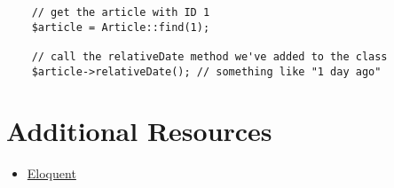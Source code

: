 \begin{verbatim}
    // get the article with ID 1
    $article = Article::find(1);

    // call the relativeDate method we've added to the class
    $article->relativeDate(); // something like "1 day ago"
\end{verbatim}



\section{Additional Resources}

\begin{itemize}[leftmargin=*]
    \item \href{http://laravel.com/docs/master/eloquent}{Eloquent}
\end{itemize}

